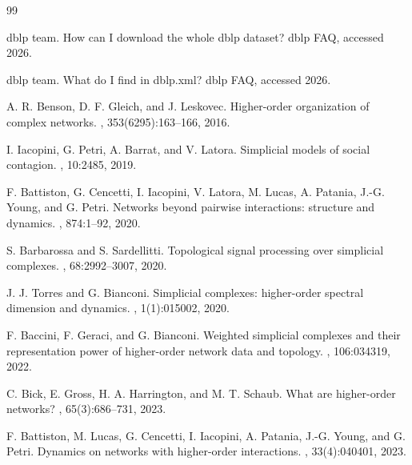\documentclass[11pt]{article}
\begin{document}
\begin{thebibliography}{99}

dblp team.
\newblock How can I download the whole dblp dataset?
\newblock dblp FAQ, accessed 2026.

dblp team.
\newblock What do I find in dblp.xml?
\newblock dblp FAQ, accessed 2026.

A. R. Benson, D. F. Gleich, and J. Leskovec.
\newblock Higher-order organization of complex networks.
, 353(6295):163--166, 2016.

I. Iacopini, G. Petri, A. Barrat, and V. Latora.
\newblock Simplicial models of social contagion.
, 10:2485, 2019.

F. Battiston, G. Cencetti, I. Iacopini, V. Latora, M. Lucas, A. Patania, J.-G. Young, and G. Petri.
\newblock Networks beyond pairwise interactions: structure and dynamics.
, 874:1--92, 2020.

S. Barbarossa and S. Sardellitti.
\newblock Topological signal processing over simplicial complexes.
, 68:2992--3007, 2020.

J. J. Torres and G. Bianconi.
\newblock Simplicial complexes: higher-order spectral dimension and dynamics.
, 1(1):015002, 2020.

F. Baccini, F. Geraci, and G. Bianconi.
\newblock Weighted simplicial complexes and their representation power of higher-order network data and topology.
, 106:034319, 2022.

C. Bick, E. Gross, H. A. Harrington, and M. T. Schaub.
\newblock What are higher-order networks?
, 65(3):686--731, 2023.

F. Battiston, M. Lucas, G. Cencetti, I. Iacopini, A. Patania, J.-G. Young, and G. Petri.
\newblock Dynamics on networks with higher-order interactions.
, 33(4):040401, 2023.

\end{thebibliography}
\end{document}
